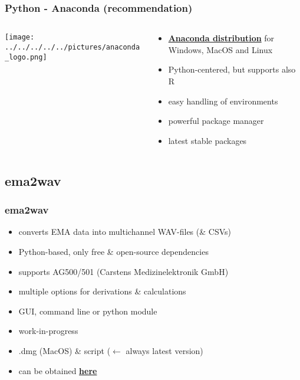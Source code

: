 \documentclass[12pt,a4paper]{beamer}
\begin{document}
\begin{frame}
    \frametitle{Python - Anaconda (recommendation)}
    \begin{columns}
        \begin{column}{.5\textwidth}
            \texttt{[image: ../../../../../pictures/anaconda\_logo.png]}
        \end{column}
        \begin{column}{.5\textwidth}
            \begin{itemize}
                \item \href{https://www.anaconda.com/products/distribution}{\textbf{Anaconda distribution}} for Windows, MacOS and Linux
                \item Python-centered, but supports also R
                \item easy handling of environments
                \item powerful package manager
                \item latest stable packages
            \end{itemize}
        \end{column}
    \end{columns}
    

\end{frame}


\subsection{ema2wav}
\begin{frame}
    \frametitle{ema2wav}
    \begin{itemize}
        \item converts EMA data into multichannel WAV-files (\& CSVs)
        \item Python-based, only free \& open-source dependencies
        \item supports AG500/501 (Carstens Medizinelektronik GmbH)
        \item multiple options for derivations \& calculations
        \item GUI, command line or python module
        \item work-in-progress
        \item .dmg (MacOS) \& script ($\leftarrow$ always latest version)
        \item can be obtained \href{https://github.com/phbuech/ema2wav}{\textbf{here}}
    \end{itemize}
\end{frame}
\end{document}
